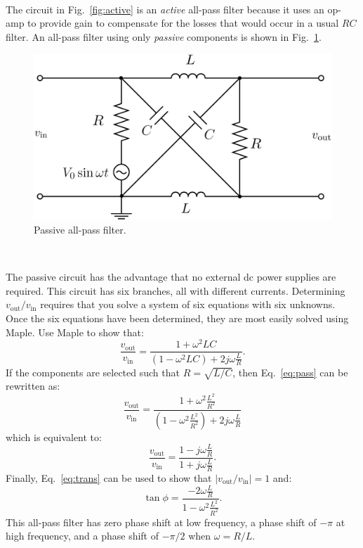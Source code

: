 \documentclass[12pt,oneside,openany,letterpaper]{article}
\begin{document}
~

\noindent The circuit in Fig.~\ref{fig:active} is an {\it active} all-pass filter because it uses an op-amp to provide gain to compensate for the losses that would occur in a usual $RC$ filter.  An all-pass filter using only {\it passive} components is shown in Fig.~\ref{fig:passive}.
\begin{figure}[h!]
\begin{center}
\includegraphics[width=10 cm]{figures/passiveAllPass.eps}
\caption{\label{fig:passive} Passive all-pass filter.}
\end{center}
\end{figure}

~

\noindent The passive circuit has the advantage that no external dc power supplies are required.  This circuit has six branches, all with different currents.  Determining $v_\mathrm{out}/v_\mathrm{in}$ requires that you solve a system of six equations with six unknowns.  Once the six equations have been determined, they are most easily solved using Maple.  Use Maple to show that:
\begin{equation}
\frac{v_\mathrm{out}}{v_\mathrm{in}}=\frac{1+\omega^2LC}{\left(1-\omega^2LC\right)+2j\omega\frac{L}{R}}.
\label{eq:pass}
\end{equation}
If the components are selected such that $R=\sqrt{L/C}$, then Eq.~\ref{eq:pass} can be rewritten as:
\begin{equation}
\frac{v_\mathrm{out}}{v_\mathrm{in}}=\frac{1+\omega^2\frac{L^2}{R^2}}{\left(1-\omega^2\frac{L^2}{R^2}\right)+2j\omega\frac{L}{R}}
\end{equation}
which is equivalent to:
\begin{equation}
\frac{v_\mathrm{out}}{v_\mathrm{in}}=\frac{1-j\omega\frac{L}{R}}{1+j\omega\frac{L}{R}}.
\label{eq:trans}
\end{equation}
Finally, Eq.~\ref{eq:trans} can be used to show that $\left\vert v_\mathrm{out}/v_\mathrm{in}\right\vert=1$ and:
\begin{equation}
\tan\phi=\frac{-2\omega\frac{L}{R}}{1-\omega^2\frac{L^2}{R^2}}.
\end{equation}
This all-pass filter has zero phase shift at low frequency, a phase shift of $-\pi$ at high frequency, and a phase shift of $-\pi/2$ when $\omega=R/L$.
\end{document}
